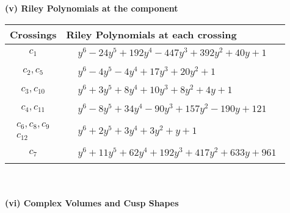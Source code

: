\documentclass[1p]{elsarticle_modified}
\theoremstyle{definition}
\begin{document}
\newpage\renewcommand{\arraystretch}{1}
\flushleft \textbf{(v) Riley Polynomials at the component}\newline \\
\begin{tabular}{m{50pt}|m{274pt}}
Crossings & \hspace{64pt}Riley Polynomials at each crossing \\
\hline $$\begin{aligned}c_{1}\end{aligned}$$&$\begin{aligned}
&y^6-24 y^5+192 y^4-447 y^3+392 y^2+40 y+1
\end{aligned}$\\
\hline $$\begin{aligned}c_{2},c_{5}\end{aligned}$$&$\begin{aligned}
&y^6-4 y^5-4 y^4+17 y^3+20 y^2+1
\end{aligned}$\\
\hline $$\begin{aligned}c_{3},c_{10}\end{aligned}$$&$\begin{aligned}
&y^6+3 y^5+8 y^4+10 y^3+8 y^2+4 y+1
\end{aligned}$\\
\hline $$\begin{aligned}c_{4},c_{11}\end{aligned}$$&$\begin{aligned}
&y^6-8 y^5+34 y^4-90 y^3+157 y^2-190 y+121
\end{aligned}$\\
\hline $$\begin{aligned}c_{6},c_{8},c_{9}\\c_{12}\end{aligned}$$&$\begin{aligned}
&y^6+2 y^5+3 y^4+3 y^2+y+1
\end{aligned}$\\
\hline $$\begin{aligned}c_{7}\end{aligned}$$&$\begin{aligned}
&y^6+11 y^5+62 y^4+192 y^3+417 y^2+633 y+961
\end{aligned}$\\
\hline
\end{tabular}\\~\\
\newpage\flushleft \textbf{(vi) Complex Volumes and Cusp Shapes}
\end{document}
